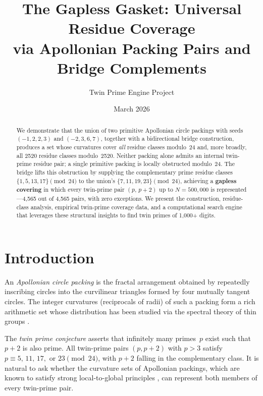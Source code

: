 \documentclass[12pt,a4paper]{article}
\title{The Gapless Gasket: Universal Residue Coverage\\
via Apollonian Packing Pairs and Bridge Complements}
\author{Twin Prime Engine Project}
\date{March 2026}
\theoremstyle{remark}
\begin{document}
\maketitle

\begin{abstract}
We demonstrate that the union of two primitive Apollonian circle packings
with seeds $(-1,2,2,3)$ and $(-2,3,6,7)$, together with a bidirectional
bridge construction, produces a set whose curvatures cover \emph{all}
residue classes modulo~24 and, more broadly, all 2520 residue classes
modulo~2520.  Neither packing alone admits an internal twin-prime residue
pair; a single primitive packing is locally obstructed modulo~24. The bridge
lifts this obstruction by supplying the complementary prime residue classes
$\{1,5,13,17\}\pmod{24}$ to the union's $\{7,11,19,23\}\pmod{24}$,
achieving a \textbf{gapless covering} in which every twin-prime pair
$(p,\,p{+}2)$ up to $N=500{,}000$ is represented---4{,}565 out of
4{,}565 pairs, with zero exceptions. We present the construction,
residue-class analysis, empirical twin-prime coverage data, and a
computational search engine that leverages these structural insights to
find twin primes of 1{,}000+ digits.
\end{abstract}

\section{Introduction}

An \emph{Apollonian circle packing} is the fractal arrangement obtained
by repeatedly inscribing circles into the curvilinear triangles formed by
four mutually tangent circles.  The integer curvatures (reciprocals of
radii) of such a packing form a rich arithmetic set whose distribution has
been studied via the spectral theory of thin groups
\cite{KontorovichOh2011,Bourgain2012}.

The \emph{twin prime conjecture} asserts that infinitely many primes~$p$
exist such that $p+2$ is also prime. All twin-prime pairs $(p,p+2)$ with
$p>3$ satisfy $p\equiv 5,\,11,\,17,$ or $23\pmod{24}$, with $p+2$ falling
in the complementary class. It is natural to ask whether the curvature sets
of Apollonian packings, which are known to satisfy strong local-to-global
principles \cite{BourgainKontorovich2014}, can represent both members of
every twin-prime pair.
\end{document}
